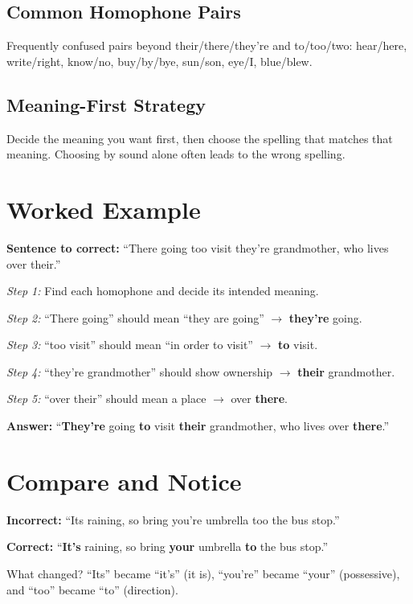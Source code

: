 \subsection*{Common Homophone Pairs}
Frequently confused pairs beyond their/there/they're and to/too/two: hear/here, write/right, know/no, buy/by/bye, sun/son, eye/I, blue/blew.

\subsection*{Meaning-First Strategy}
Decide the meaning you want first, then choose the spelling that matches that meaning. Choosing by sound alone often leads to the wrong spelling.

\section{Worked Example}
\begin{examplebox}
\textbf{Sentence to correct:} ``There going too visit they're grandmother, who lives over their.''

\textit{Step 1:} Find each homophone and decide its intended meaning.

\textit{Step 2:} ``There going'' should mean ``they are going'' $\rightarrow$ \textbf{they're} going.

\textit{Step 3:} ``too visit'' should mean ``in order to visit'' $\rightarrow$ \textbf{to} visit.

\textit{Step 4:} ``they're grandmother'' should show ownership $\rightarrow$ \textbf{their} grandmother.

\textit{Step 5:} ``over their'' should mean a place $\rightarrow$ over \textbf{there}.

\textbf{Answer:} ``\textbf{They're} going \textbf{to} visit \textbf{their} grandmother, who lives over \textbf{there}.''
\end{examplebox}

\section{Compare and Notice}
\textbf{Incorrect:} ``Its raining, so bring you're umbrella too the bus stop.''

\textbf{Correct:} ``\textbf{It's} raining, so bring \textbf{your} umbrella \textbf{to} the bus stop.''

What changed? ``Its'' became ``it's'' (it is), ``you're'' became ``your'' (possessive), and ``too'' became ``to'' (direction).

